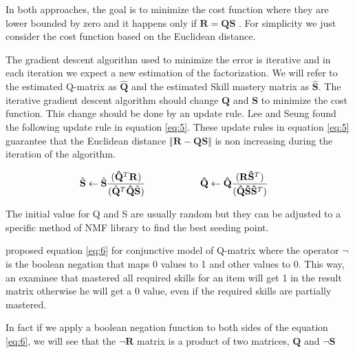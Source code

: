 In both approaches, the goal is to minimize the cost function where they are lower bounded by zero and it happens only if $\mathbf{R}=\mathbf{Q}\mathbf{S}$ \citep{seung2001algorithms}. For simplicity we just consider the cost function based on the Euclidean distance.

The gradient descent algorithm used to minimize the error is iterative and in each iteration we expect a new estimation of the factorization. We will refer to the estimated Q-matrix{ as} $\hat{\mathbf{Q}}$ and{ the} estimated Skill mastery matrix{ as} $\hat{\mathbf{S}}$.  The iterative gradient descent algorithm should change $\mathbf{Q}$ and $\mathbf{S}$ to minimize the cost function. This change should be done by an update rule. Lee and Seung \citep{seung2001algorithms} found the following update rule in equation \eqref{eq:5}. These update rules in equation \eqref{eq:5} guarantee that the Euclidean distance $\left\Vert \mathbf{R}-\mathbf{Q}\mathbf{S}\right\Vert $ is non increasing during the iteration of the algorithm.

\begin{equation}
\begin{aligned}\hat{\mathbf{S}}\leftarrow\hat{\mathbf{S}}\frac{(\mathbf{\hat{Q}}^{T}\mathbf{R})}{(\hat{\mathbf{Q}}^{T}\mathbf{\hat{Q}}\hat{\mathbf{S}})}\end{aligned}
\hspace{20mm}\begin{aligned} & \mathbf{\hat{Q}}\leftarrow\mathbf{\hat{Q}}\frac{(\mathbf{R}\mathbf{\hat{\mathbf{S}}}^{T})}{(\mathbf{\hat{Q}}\mathbf{\hat{\mathbf{S}}}\mathbf{\hat{\mathbf{S}}}^{T})}\end{aligned}
\label{eq:5}
\end{equation}


The initial value for Q and S are usually random but they can be adjusted to a specific method of \ac{NMF} library to find the best seeding point.



\citet{Barnes2005} proposed equation \ref{eq:6} for conjunctive model of Q-matrix where the operator $\neg$ is the boolean negation that maps 0 values to 1 and other values to 0. This way, an examinee that mastered all required skills for an item will get 1 in the result matrix otherwise he will get a 0 value, even if the required skills are partially mastered.

In fact if we apply a boolean negation function to both sides of the equation \ref{eq:6}, we will see that the $\neg\mathbf{R}$ matrix is a product of two matrices, $\mathbf{Q}$ and $\neg\mathbf{S}$

